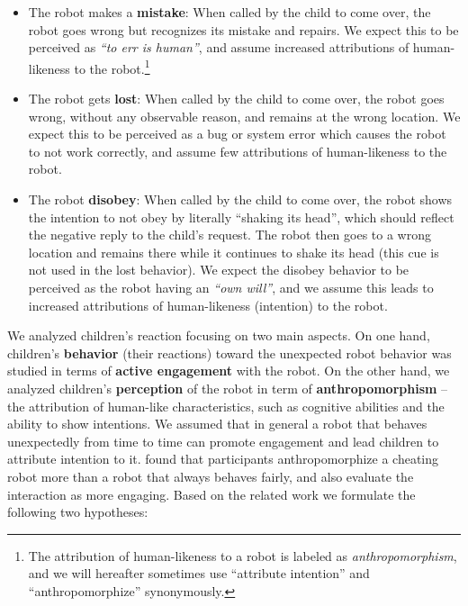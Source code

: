 \documentclass{sig-alternate}
\begin{document}
\begin{itemize}

    \item The robot makes a \textbf{mistake}: When called by the child to come
        over, the robot goes wrong but recognizes its mistake and repairs. We
        expect this to be perceived as \textit{``to err is human''}, and assume
        increased attributions of human-likeness to the robot.\footnote{The
        attribution of human-likeness to a robot is labeled as
        \textit{anthropomorphism}, and we will hereafter sometimes use ``attribute
        intention'' and ``anthropomorphize'' synonymously.} 

    \item The robot gets \textbf{lost}: When called by the child to come over,
        the robot goes wrong, without any observable reason, and remains at the
        wrong location. We expect this to be perceived as a bug or system error
        which causes the robot to not work correctly, and assume few
        attributions of human-likeness to the robot.

    \item The robot \textbf{disobey}: When called by the child to come over, the
        robot shows the intention to not obey by literally ``shaking its head'',
        which should reflect the negative reply to the child's request. The
        robot then goes to a wrong location and remains there while it continues
        to shake its head (this cue is not used in the lost behavior). We expect
        the disobey behavior to be perceived as the robot having an
        \textit{``own will''}, and we assume this leads to increased
        attributions of human-likeness (intention) to the robot.

\end{itemize}	

We analyzed children's reaction focusing on two main aspects. On one hand,
children's \textbf{behavior} (their reactions) toward the unexpected robot
behavior was studied in terms of \textbf{active engagement} with the robot. On
the other hand, we analyzed children's \textbf{perception} of the robot in term
of \textbf{anthropomorphism} -- the attribution of human-like characteristics,
such as cognitive abilities and the ability to show intentions. We assumed that
in general a robot that behaves unexpectedly from time to time can promote
engagement and lead children to attribute intention to it. \cite{short_no_2010}
found that participants anthropomorphize a cheating robot more than a robot that
always behaves fairly, and also evaluate the interaction as more engaging. Based
on the related work we formulate the following two hypotheses:
\end{document}
